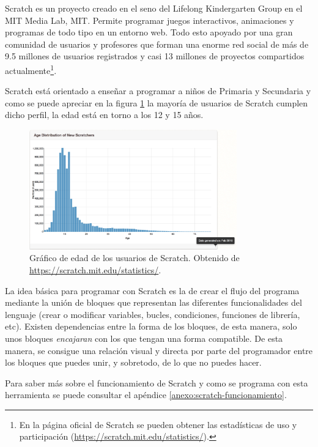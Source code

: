 Scratch\cite{scratch} es un proyecto creado en el seno del Lifelong Kindergarten Group en el MIT Media Lab, \acrfull{MIT}. Permite programar juegos interactivos, animaciones y programas de todo tipo en un entorno web. Todo esto apoyado por una gran comunidad de usuarios y profesores que forman una enorme red social de más de 9.5 millones de usuarios registrados y casi 13 millones de proyectos compartidos actualmente\footnote{En la página oficial de Scratch se pueden obtener las estadísticas de uso y participación (\url{https://scratch.mit.edu/statistics/}).}.

Scratch está orientado a enseñar a programar a niños de Primaria y Secundaria y como se puede apreciar en la figura \ref{fig:scratch-edad} la mayoría de usuarios de Scratch cumplen dicho perfil, la edad está en torno a los 12 y 15 años.

\begin{figure}[!ht]
	\begin{centering}
		\includegraphics[width=0.8\textwidth]{images/scratch-edad.png}
			\caption{Gráfico de edad de los usuarios de Scratch. Obtenido de \url{https://scratch.mit.edu/statistics/}.}
				\label{fig:scratch-edad}
	\end{centering}
\end{figure}


La idea básica para programar con Scratch es la de crear el flujo del programa mediante la unión de bloques que representan las diferentes funcionalidades del lenguaje (crear o modificar variables, bucles, condiciones, funciones de librería, etc). Existen dependencias entre la forma de los bloques, de esta manera, solo unos bloques \emph{encajaran} con los que tengan una forma compatible. De esta manera, se consigue una relación visual y directa por parte del programador entre los bloques que puedes unir, y sobretodo, de lo que no puedes hacer.

Para saber más sobre el funcionamiento de Scratch y como se programa con esta herramienta se puede consultar el apéndice \ref{anexo:scratch-funcionamiento}.

